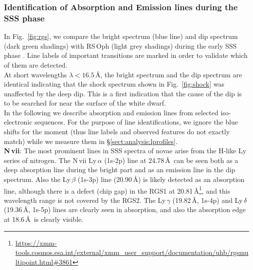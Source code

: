 \documentclass{aa}
\newcommand{\chandra}{{\it Chandra}}
\begin{document}
\subsubsection{Identification of Absorption and Emission lines during the SSS phase}
\label{sect:descr:lines}

\begin{figure*}[!ht]
        \caption{\label{fig:rgs}Comparison of RGS spectra of V3890\,Sgr
extracted during the dip (dark green shadings) and during time intervals
excluding the dip and the initial rise (blue line). The top panel shows
the full spectral range of interest while the panels below zoom into
more detail. The light grey
shading is the \chandra/LETGS spectrum of RS\,Oph taken on day
39.7 after outburst (Chandra ObsID 7296), scaled down by a factor 5.
See \S\ref{sect:descr:lines} for discussion. Labels with different colours
for different ions are included at their rest wavelengths.
}
\end{figure*}

In Fig.~\ref{fig:rgs}, we compare the bright spectrum (blue line)
and dip spectrum (dark green shadings) with RS\,Oph (light grey shadings)
during the early SSS phase \citep{nessrsoph}. Line labels of important
transitions are marked in order to validate which of them are detected.\\

At short wavelengths $\lambda<16.5$\,\AA, the bright spectrum and the dip
spectrum are identical indicating that the shock spectrum shown in
Fig.~\ref{fig:shock} was unaffected by the deep dip. This is a first
indication that the cause of the dip is to be searched for near
the surface of the white dwarf.\\

In the following we describe absorption and emission lines from selected
iso-electronic sequences. For the purpose of line identifications, we
ignore the blue shifts for the moment (thus line
labels and observed features do not exactly match) while we measure
them in \S\ref{sect:analysis:lprofiles}.\\

\noindent
{\bf N\,{\sc vii}}: The most prominent lines in SSS spectra of novae arise from
the H-like Ly series of nitrogen. The N\,{\sc vii} Ly\,$\alpha$ (1s-2p) line at
24.78\,\AA\ can be seen both as a deep absorption line during the bright
part and as an emission line in the dip spectrum. Also the Ly\,$\beta$ (1s-3p) line
(20.90\,\AA) is likely detected as an absorption line, although there is a
defect (chip gap) in the RGS1 at
20.81\,\AA\footnote{\url{https://xmm-tools.cosmos.esa.int/external/xmm\_user\_support/documentation/uhb/rgsmultipoint.html\#3861}},
and this wavelength range is not covered by the RGS2. The Ly\,$\gamma$ (19.82\,\AA, 1s-4p)
and Ly\,$\delta$ (19.36\,\AA, 1s-5p) lines are clearly seen in absorption, and also
the absorption edge at 18.6\,\AA\ is clearly visible.\\
\end{document}
